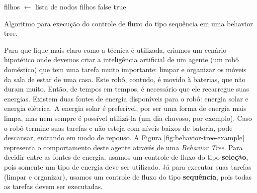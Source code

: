 \begin{algorithm}[H]
\begin{center}
	\begin{algorithmic}[1]
        \STATE filhos $\gets$ lista de nodos filhos
                \RETURN false
            \ENDIF
        \ENDFOR
        \RETURN true
    \end{algorithmic}
\end{center}
\caption[Algoritmo para execução do controle de fluxo do tipo sequência em uma
behavior tree.]
{\label{alg:behavior-tree-sequence} Algoritmo para execução do controle de fluxo
do tipo sequência em uma behavior tree.}
\end{algorithm}

Para que fique mais claro como a técnica é utilizada, criamos um cenário
hipotético onde devemos criar a inteligência artificial de um agente (um robô
doméstico) que tem uma tarefa muito importante: limpar e organizar os móveis da
sala de estar de uma casa. Este robô, contudo, é movido à baterias, que não
duram muito. Então, de tempos em tempos, é necessário que ele recarregue suas
energias. Existem duas fontes de energia disponíveis para o robô: energia solar
e energia elétrica. A energia solar é preferível, por ser uma forma de energia
mais limpa, mas nem sempre é possível utilizá-la (um dia chuvoso, por exemplo).
Caso o robô termine suas tarefas e não esteja com níveis baixos de bateria, pode
descansar, entrando em modo de repouso.  A Figura
\ref{fig:behavior-tree-example} representa o comportamento deste agente através
de uma \textit{Behavior Tree}. Para decidir entre as fontes de energia, usamos
um controle de fluxo do tipo \textbf{seleção}, pois somente um tipo de energia
deve ser utilizado. Já para executar suas tarefas (limpar e organizar), usamos
um controle de fluxo do tipo \textbf{sequência}, pois todas as tarefas devem ser
executadas.

